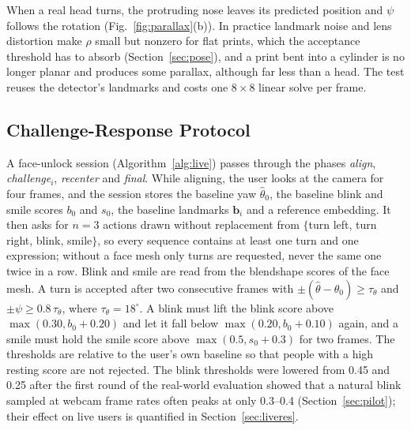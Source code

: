 \documentclass[journal]{IEEEtran}
\begin{document}
When a real head turns, the protruding nose leaves its predicted position and $\psi$ follows the rotation (Fig.~\ref{fig:parallax}(b)). In practice landmark noise and lens distortion make $\rho$ small but nonzero for flat prints, which the acceptance threshold has to absorb (Section~\ref{sec:pose}), and a print bent into a cylinder is no longer planar and produces some parallax, although far less than a head. The test reuses the detector's landmarks and costs one $8\times8$ linear solve per frame.

\subsection{Challenge-Response Protocol}\label{sec:protocol}
A face-unlock session (Algorithm~\ref{alg:live}) passes through the phases \emph{align}, \emph{challenge}$_i$, \emph{recenter} and \emph{final}. While aligning, the user looks at the camera for four frames, and the session stores the baseline yaw $\hat\theta_0$, the baseline blink and smile scores $b_0$ and $s_0$, the baseline landmarks $\mathbf{b}_i$ and a reference embedding. It then asks for $n=3$ actions drawn without replacement from $\{$turn left, turn right, blink, smile$\}$, so every sequence contains at least one turn and one expression; without a face mesh only turns are requested, never the same one twice in a row. Blink and smile are read from the blendshape scores of the face mesh. A turn is accepted after two consecutive frames with $\pm(\hat\theta-\hat\theta_0)\ge\tau_\theta$ and $\pm\psi\ge0.8\,\tau_\theta$, where $\tau_\theta=18^\circ$. A blink must lift the blink score above $\max(0.30,b_0+0.20)$ and let it fall below $\max(0.20,b_0+0.10)$ again, and a smile must hold the smile score above $\max(0.5,s_0+0.3)$ for two frames. The thresholds are relative to the user's own baseline so that people with a high resting score are not rejected. The blink thresholds were lowered from 0.45 and 0.25 after the first round of the real-world evaluation showed that a natural blink sampled at webcam frame rates often peaks at only 0.3--0.4 (Section~\ref{sec:pilot}); their effect on live users is quantified in Section~\ref{sec:liveres}.
\end{document}
